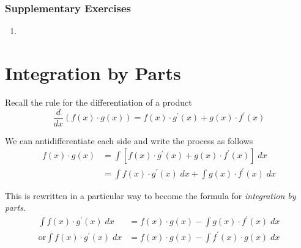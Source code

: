 \subsubsection{Supplementary Exercises}
\begin{enumerate}
\item   
\columnsep =30pt
  \end{enumerate}

\clearpage
\section{Integration by Parts}
Recall the rule for the differentiation of a product
\begin{equation*}\frac{d}{d x} \left (f (x) \cdot g (x)\right ) =f (x) \cdot g^{ \prime } (x) +g (x) \cdot f^{ \prime } (x)
\end{equation*}

We can antidifferentiate each side and write the process as follows
\begin{align*}f (x) \cdot g (x) &  = \int \left [f (x) \cdot g^{ \prime } (x) +g (x) \cdot f^{ \prime } (x)\right ]\; d x \\
 &  = \int f (x) \cdot g^{ \prime } (x)\; d x +\int g (x) \cdot f^{ \prime } (x)\; d x\end{align*}

This is rewritten in a particular way to become the formula for \emph{integration by parts}.
\begin{align}\int f (x) \cdot g^{ \prime } (x)\; d x &  = f (x) \cdot g (x) -\int g (x) \cdot f^{ \prime } (x)\; d x \tag{1} \\
\text{or}\int f (x) \cdot g^{ \prime } (x)\; d x &  = f (x) \cdot g (x) -\int f^{ \prime } (x) \cdot g (x)\; d x \tag{2}\end{align}

